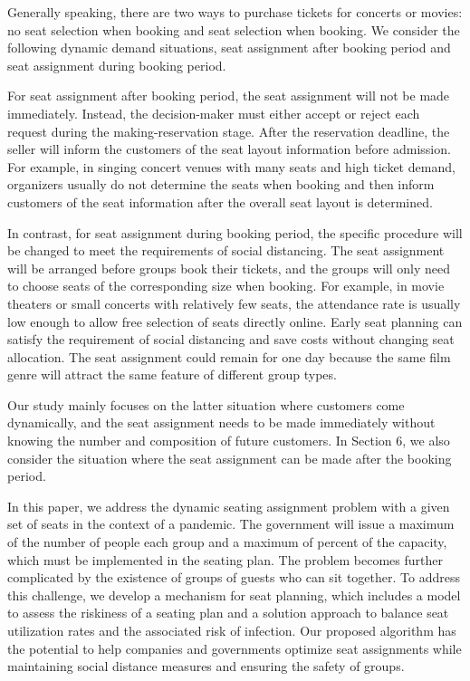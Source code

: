 


Generally speaking, there are two ways to purchase tickets for concerts or movies: no seat selection when booking and seat selection when booking. We consider the following dynamic demand situations, seat assignment after booking period and seat assignment during booking period.

For seat assignment after booking period, the seat assignment will not be made immediately. Instead, the decision-maker must either accept or reject each request during the making-reservation stage. After the reservation deadline, the seller will inform the customers of the seat layout information before admission. For example, in singing concert venues with many seats and high ticket demand, organizers usually do not determine the seats when booking and then inform customers of the seat information after the overall seat layout is determined.

In contrast, for seat assignment during booking period, the specific procedure will be changed to meet the requirements of social distancing. The seat assignment will be arranged before groups book their tickets, and the groups will only need to choose seats of the corresponding size when booking. For example, in movie theaters or small concerts with relatively few seats, the attendance rate is usually low enough to allow free selection of seats directly online. Early seat planning can satisfy the requirement of social distancing and save costs without changing seat allocation. The seat assignment could remain for one day because the same film genre will attract the same feature of different group types.

Our study mainly focuses on the latter situation where customers come dynamically, and the seat assignment needs to be made immediately without knowing the number and composition of future customers. In Section 6, we also consider the situation where the seat assignment can be made after the booking period.


In this paper, we address the dynamic seating assignment problem with a given set of seats in the context of a pandemic. The government will issue a maximum of the number of people each group and a maximum of percent of the capacity, which must be implemented in the seating plan. The problem becomes further complicated by the existence of groups of guests who can sit together. To address this challenge, we develop a mechanism for seat planning, which includes a model to assess the riskiness of a seating plan and a solution approach to balance seat utilization rates and the associated risk of infection. Our proposed algorithm has the potential to help companies and governments optimize seat assignments while maintaining social distance measures and ensuring the safety of groups.



